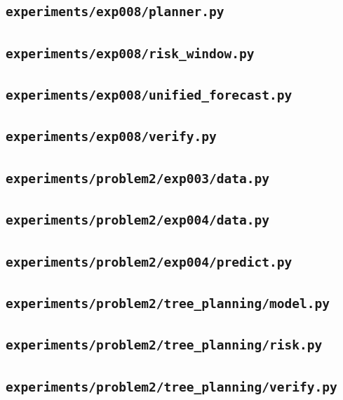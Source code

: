 \subsection*{\nolinkurl{experiments/exp008/planner.py}}


\subsection*{\nolinkurl{experiments/exp008/risk_window.py}}


\subsection*{\nolinkurl{experiments/exp008/unified_forecast.py}}


\subsection*{\nolinkurl{experiments/exp008/verify.py}}


\subsection*{\nolinkurl{experiments/problem2/exp003/data.py}}


\subsection*{\nolinkurl{experiments/problem2/exp004/data.py}}


\subsection*{\nolinkurl{experiments/problem2/exp004/predict.py}}


\subsection*{\nolinkurl{experiments/problem2/tree_planning/model.py}}


\subsection*{\nolinkurl{experiments/problem2/tree_planning/risk.py}}


\subsection*{\nolinkurl{experiments/problem2/tree_planning/verify.py}}

\endgroup
